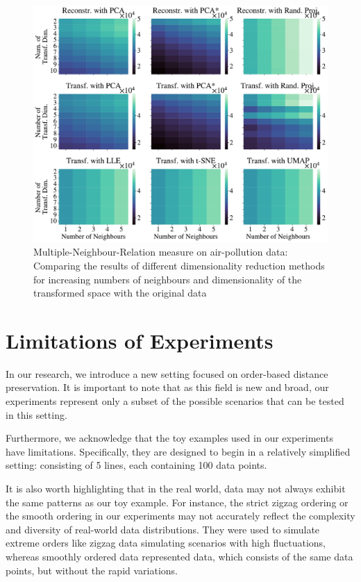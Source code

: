 \documentclass[pdftex,12pt,a4paper]{report}
\begin{document}
\begin{figure}
    \includegraphics[width = \textwidth]{images/real-world/air_pollution/dyn_low_dim_vs_num_neigh/multiple_scalar_product/all_methods_1runs_1lines_4380points_5neighbours.pdf}
    \caption{Multiple-Neighbour-Relation measure on air-pollution data: Comparing the results of different dimensionality reduction methods for increasing numbers of neighbours and dimensionality of the transformed space with the original data}
    \label{fig:num_neigh_vs_dyn_low-mscal-air}
\end{figure}


\FloatBarrier
\section{Limitations of Experiments}
In our research, we introduce a new setting focused on order-based distance preservation.
It is important to note that as this field is new and broad, our experiments represent only a subset of the possible scenarios that can be tested in this setting.

Furthermore, we acknowledge that the toy examples used in our experiments have limitations.
Specifically, they are designed to begin in a relatively simplified setting: consisting of 5 lines, each containing 100 data points.

It is also worth highlighting that in the real world, data may not always exhibit the same patterns as our toy example.
For instance, the strict zigzag ordering or the smooth ordering in our experiments may not accurately reflect the complexity and diversity of real-world data distributions.
They were used to simulate extreme orders like zigzag data simulating scenarios with high fluctuations, whereas smoothly ordered data represented data, which consists of the same data points, but without the rapid variations.
\end{document}
